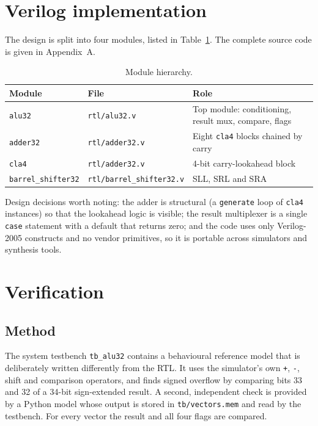 \documentclass[11pt,a4paper]{article}
\begin{document}
\section{Verilog implementation}
The design is split into four modules, listed in Table~\ref{tab:mods}. The complete source code is given in Appendix~A.
\begin{table}[H]\centering
\begin{tabular}{@{}lll@{}}\toprule
Module & File & Role\\\midrule
\texttt{alu32} & \texttt{rtl/alu32.v} & Top module: conditioning, result mux, compare, flags\\
\texttt{adder32} & \texttt{rtl/adder32.v} & Eight \texttt{cla4} blocks chained by carry\\
\texttt{cla4} & \texttt{rtl/adder32.v} & 4-bit carry-lookahead block\\
\texttt{barrel\_shifter32} & \texttt{rtl/barrel\_shifter32.v} & SLL, SRL and SRA\\\bottomrule
\end{tabular}
\caption{Module hierarchy.}\label{tab:mods}
\end{table}
Design decisions worth noting: the adder is structural (a \texttt{generate} loop of \texttt{cla4} instances) so that the lookahead logic is visible; the result multiplexer is a single \texttt{case} statement with a default that returns zero; and the code uses only Verilog-2005 constructs and no vendor primitives, so it is portable across simulators and synthesis tools.

\section{Verification}
\subsection{Method}
The system testbench \texttt{tb\_alu32} contains a behavioural reference model that is deliberately written differently from the RTL. It uses the simulator's own \texttt{+}, \texttt{-}, shift and comparison operators, and finds signed overflow by comparing bits 33 and 32 of a 34-bit sign-extended result. A second, independent check is provided by a Python model whose output is stored in \texttt{tb/vectors.mem} and read by the testbench. For every vector the result and all four flags are compared.
\end{document}
